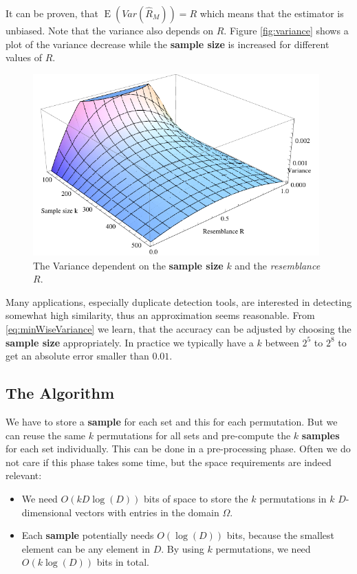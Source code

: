 \documentclass[a4paper]{article}
\DeclareMathOperator{\E}{E}
\begin{document}
It can be proven, that $\E(Var(\hat{R}_M)) = R$ which means that the estimator is unbiased. Note that the variance also depends on $R$. Figure \vref{fig:variance} shows a plot of the variance decrease while the \textbf{sample size} is increased for different values of $R$.

\begin{figure}[t]
\begin{center}
\includegraphics[width=11cm]{variance-graph.pdf}
\end{center}
\caption{The Variance dependent on the \textbf{sample size} $k$ and the \emph{resemblance} $R$.}
\label{fig:variance}
\end{figure}

Many applications, especially duplicate detection tools, are interested in detecting somewhat high similarity, thus an approximation seems reasonable. From \vref{eq:minWiseVariance} we learn, that the accuracy can be adjusted by choosing the \textbf{sample size} appropriately. In practice we typically have a $k$ between $2^5$ to $2^8$ to get an absolute error smaller than $0.01$.


\subsection{The Algorithm}

We have to store a \textbf{sample} for each set and this for each permutation. But we can reuse the same $k$ permutations for all sets and pre-compute the $k$ \textbf{samples} for each set individually. This can be done in a pre-processing phase. Often we do not care if this phase takes some time, but the space requirements are indeed relevant:
\begin{itemize}
\item We need $O(kD\log(D))$ bits of space to store the $k$ permutations in $k$ $D$-dimensional vectors with entries in the domain $\Omega$.
\item Each \textbf{sample} potentially needs $O(\log(D))$ bits, because the smallest element can be any element in $D$. By using $k$ permutations, we need $O(k \log(D))$ bits in total.
\end{itemize}
\end{document}
